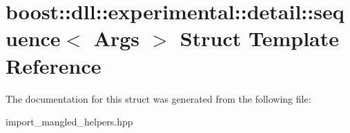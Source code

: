 \hypertarget{a01432}{}\section{boost\+:\+:dll\+:\+:experimental\+:\+:detail\+:\+:sequence$<$ Args $>$ Struct Template Reference}
\label{a01432}


The documentation for this struct was generated from the following file\+:\begin{DoxyCompactItemize}
\item 
import\+\_\+mangled\+\_\+helpers.\+hpp\end{DoxyCompactItemize}
